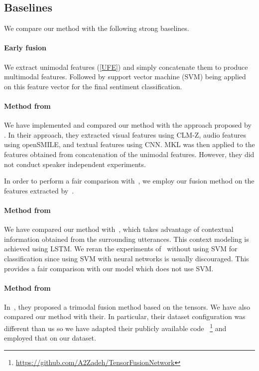 \documentclass[review]{elsarticle}
\newcommand\?[1]{\hl{#1}}
\begin{document}
\subsection{Baselines}
We compare our method with the following strong baselines.

\paragraph{Early fusion}
\label{early-fusion}
We extract unimodal features (\cref{UFE}) and simply concatenate them to
produce multimodal features. Followed by support vector machine (SVM)
being applied on this feature vector for the final sentiment
classification.

\paragraph{Method from~\citep{pordee}}
We have implemented and compared our method with the approach proposed by
\citet{pordee}. In their approach, they extracted visual features using
CLM-Z, audio features using openSMILE, and textual features using CNN. MKL was then applied to the features obtained from
concatenation of the unimodal features. However, they did not conduct speaker
independent experiments.

In order to perform a fair comparison with~\citep{pordee}, we
employ our fusion method on the features extracted by~\citet{pordee}.



\paragraph{Method from~\citep{porcon}}
We have compared our method with~\citep{pordep}, which takes
advantage of contextual information obtained from the surrounding
utterances. This context modeling is achieved using LSTM. We reran the
experiments of~\citet{pordep} without using SVM for classification since using
SVM with neural networks is usually discouraged. This provides a fair comparison
with our model which does not use SVM.

\paragraph{Method from~\citep{zadten}}
In~\citep{zadten}, they proposed a trimodal fusion method based on the tensors. We have also compared our method with their. In particular, their dataset configuration was different than us so we have adapted their publicly available code ~\footnote{\url{https://github.com/A2Zadeh/TensorFusionNetwork}} and employed that on our dataset.
\end{document}
